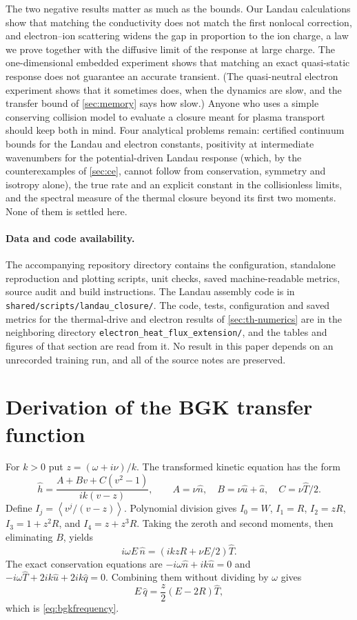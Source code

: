 \documentclass[11pt]{article}
\newcommand{\av}[1]{\left\langle #1\right\rangle}
\theoremstyle{definition}
\theoremstyle{remark}
\numberwithin{equation}{section}
\begin{document}
The two negative results matter as much as the bounds. Our Landau
calculations show that matching the conductivity does not match the
first nonlocal correction, and electron--ion scattering widens the gap
in proportion to the ion charge, a law we prove together with the
diffusive limit of the response at large charge. The one-dimensional embedded experiment
shows that matching an exact quasi-static response does not guarantee an
accurate transient. (The quasi-neutral electron experiment shows that it
sometimes does, when the dynamics are slow, and the transfer bound of
\cref{sec:memory} says how slow.) Anyone who uses a simple
conserving collision model to evaluate a closure meant for plasma
transport should keep both in mind. Four analytical problems remain:
certified continuum bounds for the Landau and electron constants,
positivity at intermediate wavenumbers for the potential-driven Landau
response (which, by the counterexamples of \cref{sec:ce}, cannot follow
from conservation, symmetry and isotropy alone), the
true rate and an explicit constant in the collisionless limits, and the spectral measure
of the thermal closure beyond its first two moments. None of them is
settled here.

\paragraph{Data and code availability.}
The accompanying repository directory contains the configuration,
standalone reproduction and plotting scripts, unit checks, saved
machine-readable metrics, source audit and build instructions.
The Landau assembly code is in
\texttt{shared/scripts/landau\_closure/}.
The code, tests, configuration and saved metrics for the thermal-drive
and electron results of \cref{sec:th-numerics} are in the neighboring
directory \texttt{electron\_heat\_flux\_extension/}, and the tables and
figures of that section are read from it.
No result in this paper depends on an unrecorded training run, and all
of the source notes are preserved.

\appendix
\section{Derivation of the BGK transfer function}\label{app:bgk}

For $k>0$ put $z=(\omega+i\nu)/k$.
The transformed kinetic equation has the form
\[
 \widehat h=\frac{A+Bv+C(v^2-1)}{ik(v-z)},\qquad
 A=\nu\widehat n,\quad B=\nu\widehat u+\widehat a,\quad
 C=\nu\widehat T/2.
\]
Define $I_j=\av{v^j/(v-z)}$. Polynomial division gives
$I_0=W$, $I_1=R$, $I_2=zR$, $I_3=1+z^2R$,
and $I_4=z+z^3R$. Taking the zeroth and second moments, then
eliminating $B$, yields
\[
 i\omega E\,\widehat n
       =(ikzR+\nu E/2)\widehat T.
\]
The exact conservation equations are
$-i\omega\widehat n+ik\widehat u=0$ and
$-i\omega\widehat T+2ik\widehat u+2ik\widehat q=0$.
Combining them without dividing by $\omega$ gives
\[
 E\,\widehat q=\frac z2(E-2R)\widehat T,
\]
which is \eqref{eq:bgkfrequency}.
\end{document}
